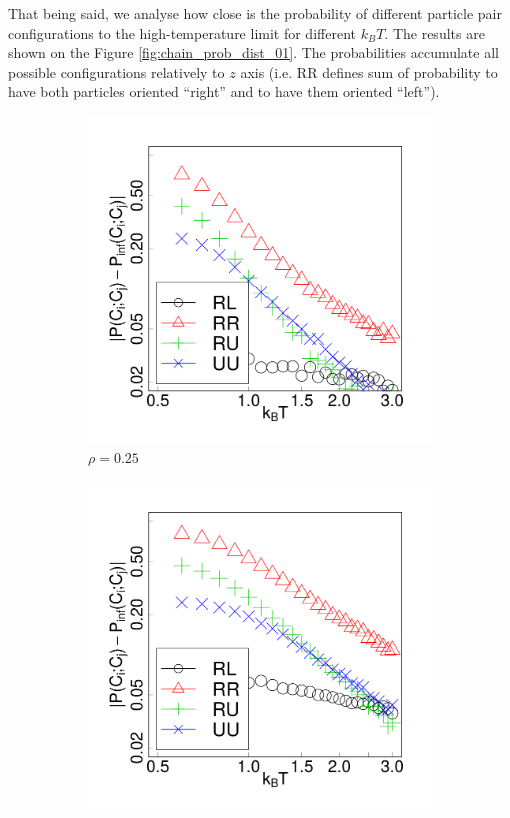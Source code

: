 That being said, we analyse how close is the probability of different particle pair configurations to the high-temperature limit for different $k_BT$. The results are shown on the Figure \ref{fig:chain_prob_dist_01}. The probabilities accumulate all possible configurations relatively to $z$ axis (i.e. RR defines sum of probability to have both particles oriented ``right'' and to have them oriented ``left'').

\begin{figure}[h]
\centering
\begin{subfigure}[t]{0.32\textwidth}
	\centering
	\includegraphics[width=\textwidth]{Images/probs_25}
	\caption{$\rho = 0.25$}
\end{subfigure}
\begin{subfigure}[t]{0.32\textwidth}
	\centering
	\includegraphics[width=\textwidth]{Images/probs_50}

\end{subfigure}
\end{figure}
